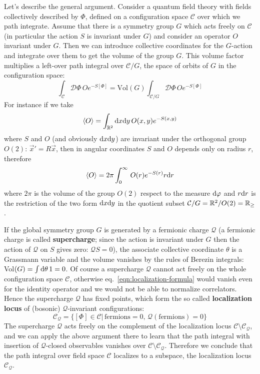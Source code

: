 \documentclass[../main/main.tex]{subfiles}
\begin{document}
Let's describe the general argument. Consider a quantum field theory with fields collectively described by $\Phi$, defined on a configuration space $\mathcal C$ over which we path integrate. Assume that there is a symmetry group $G$ which acts freely on $\mathcal C$ (in particular the action $S$ is invariant under $G$) and consider an operator $O$ invariant under $G$. Then we can introduce collective coordinates for the $G$-action and integrate over them to get the volume of the group $G$. This volume factor multiplies a left-over path integral over $\mathcal C/G$, the space of orbits of $G$ in the configuration space:
\begin{equation}\label{eqn:localization-formula}
\int_{\mathcal C}\mathcal D\Phi\, Oe^{-S[\Phi]}=\text{Vol}(G)\int_{\mathcal C/G}\mathcal D\Phi\, Oe^{-S[\Phi]}
\end{equation}
For instance if we take
\[\langle O\rangle=\int_{\mathbb{R}^2}\textup{d} x\textup{d} y\,O(x,y)e^{-S(x,y)}\]
where $S$ and $O$ (and obviously $\textup{d} x\textup{d} y$) are invariant under the orthogonal group $O(2)$: $\vec x'=R\vec x$, then in angular coordinates $S$ and $O$ depends only on radius $r$, therefore
\[\langle O\rangle=2\pi\int_0^\infty\,O(r)e^{-S(r)}r\textup{d} r\]
where $2\pi$ is the volume of the group $O(2)$ respect to the measure $\textup{d}\varphi$ and $r\textup{d} r$ is the restriction of the two form $\textup{d} x\textup{d} y$ in the quotient subset $\mathcal C/G=\mathbb{R}^2/O(2)=\mathbb{R}_\geq$.

If the global symmetry group $G$ is generated by a fermionic charge $\mathcal Q$ (a fermionic charge is called \textbf{supercharge}; since the action is invariant under $G$ then the action of $\mathcal Q$ on $S$ gives zero: $\mathcal QS=0$), the associate collective coordinate $\theta$ is a Grassmann variable and the volume vanishes by the rules of Berezin integrals: Vol$(G)=\int\textup{d}\theta\,1=0$. Of course a supercharge $\mathcal Q$ cannot act freely on the whole configuration space $\mathcal C$, otherwise eq.~\eqref{eqn:localization-formula} would vanish even for the identity operator and we would not be able to normalize correlators. Hence the supercharge $\mathcal Q$ has fixed points, which form the so called \textbf{localization locus} of (bosonic) $\mathcal Q$-invariant configurations:
\[\mathcal C_{\mathcal Q}=\{[\Phi]\in\mathcal C|\,\text{fermions}=0,\,\mathcal Q(\text{fermions})=0\}\]
The supercharge $\mathcal Q$ acts freely on the complement of the localization locus $\mathcal C\setminus\mathcal C_{\mathcal Q}$, and we can apply the above argument there to learn that the path integral with insertion of $\mathcal Q$-closed observables vanishes over $\mathcal C\setminus\mathcal C_{\mathcal Q}$. Therefore we conclude that the path integral over field space $\mathcal C$ localizes to a subspace, the localization locus $\mathcal C_{\mathcal Q}$. 
\end{document}
